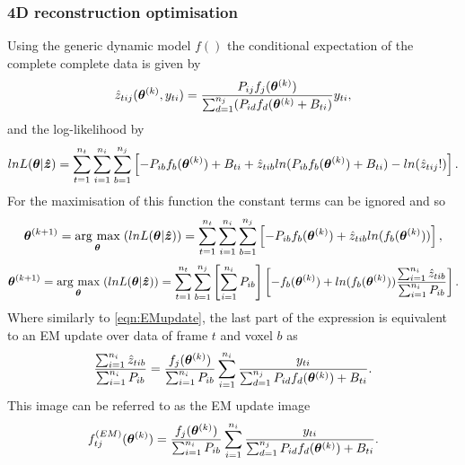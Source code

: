 \subsubsection{4D reconstruction optimisation}
Using the generic dynamic model $f()$ the conditional expectation of the complete complete data is given by 
\begin{equation}
\hat{z}_{tij}(\bm{\theta}^{(k)},y_{ti}) = 
\frac{P_{ij} f_j(\bm\theta^{(k)})}
{\sum_{d=1}^{n_j} (P_{id} f_d(\bm\theta^{(k)} + B_{ti})}y_{ti}\\,
\end{equation}
and the log-likelihood by
\begin{equation}
lnL(\bm{\theta}|\bm{\hat{z}})  =
\sum_{t=1}^{n_t} \sum_{i=1}^{n_i} \sum_{b=1}^{n_j} 
\left[ -P_{ib} f_b(\bm\theta^{(k)}) + B_{ti} + 
\hat{z}_{tib} ln( P_{ib}  f_b(\bm\theta^{(k)}) + B_{ti} ) -
ln(\hat{z}_{tij}!) \right] \\.
\end{equation}
For the maximisation of this function the constant terms can be ignored and so 
\begin{equation}
\bm{\theta}^{(k+1)} = \underset{\bm{\theta}}{\operatorname{arg}\,\operatorname{max}}\;(lnL(\bm{\theta}|\bm{\hat{z}})) = 
\sum_{t=1}^{n_t} \sum_{i=1}^{n_i} \sum_{b=1}^{n_j} 
\left[ -P_{ib} f_b(\bm\theta^{(k)}) + 
\hat{z}_{tib} ln( f_b(\bm\theta^{(k)})) 
\right] \\, 
\end{equation}
\begin{equation}
\bm{\theta}^{(k+1)} = \underset{\bm{\theta}}{\operatorname{arg}\,\operatorname{max}}\;(lnL(\bm{\theta}|\bm{\hat{z}})) = 
\sum_{t=1}^{n_t} \sum_{b=1}^{n_j} \left[ \sum_{i=1}^{n_i}  P_{ib} \right]
\left[ -f_b(\bm\theta^{(k)}) + 
ln( f_b(\bm\theta^{(k)})) 
\frac{\sum_{i=1}^{n_i} \hat{z}_{tib} }
{ \sum_{i=1}^{n_i}  P_{ib} }
\right] \\ .
\end{equation}
Where similarly to \ref{eqn:EMupdate}, the last part of the expression is equivalent to an EM update over data of frame $t$ and voxel $b$ as 
\begin{equation}
\frac{\sum_{i=1}^{n_i} \hat{z}_{tib} }
{\sum_{i=1}^{n_i}  P_{ib}}  =
\frac{f_j(\bm\theta^{(k)})}{\sum_{i=1}^{n_i}  P_{ib}}
\sum_{i=1}^{n_i} 
\frac{y_{ti}}
{\sum_{d=1}^{n_j} P_{id} f_d(\bm\theta^{(k)}) + B_{ti}}\\.
\end{equation}
This image can be referred to as the EM update image 
\begin{equation}
f_{tj}^{(EM)}(\bm{\theta}^{(k)}) = 
\frac{f_j(\bm\theta^{(k)})}{\sum_{i=1}^{n_i}  P_{ib}}
\sum_{i=1}^{n_i} 
\frac{y_{ti}}
{\sum_{d=1}^{n_j} P_{id} f_d(\bm\theta^{(k)}) + B_{ti}}\\.
\label{eqn:EM_Update_image}
\end{equation}
